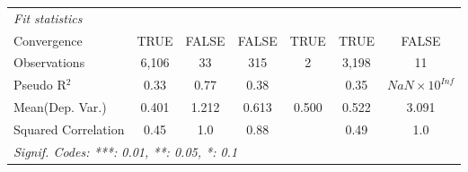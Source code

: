 \begin{tabular}{lcccccc}
   \midrule
   \emph{Fit statistics}\\
   Convergence                                                &TRUE      & FALSE         & FALSE        & TRUE & TRUE         & FALSE\\  
   Observations                                               & 6,106    & 33            & 315          & 2    & 3,198        & 11\\  
   Pseudo R$^2$                                               & 0.33     & 0.77          & 0.38         &      & 0.35         & $NaN\times 10^{Inf}$\\   
Mean(Dep. Var.) & 0.401 & 1.212 & 0.613 & 0.500 & 0.522 & 3.091 \\
   Squared Correlation                                        & 0.45     & 1.0           & 0.88         &      & 0.49         & 1.0\\  
   \midrule \midrule
   \multicolumn{7}{l}{\emph{Signif. Codes: ***: 0.01, **: 0.05, *: 0.1}}\\
\end{tabular}
\par\endgroup
